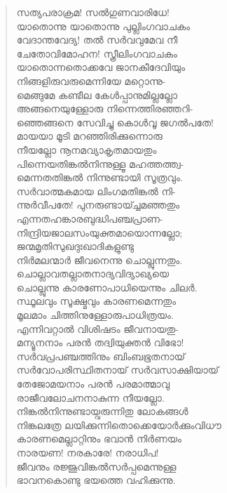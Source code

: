 \begin{verse}
സത്യപരാക്രമ! സല്‍ഗുണവാരിധേ!\\
യാതൊന്നു യാതൊന്നു പുല്ലിംഗവാചകം\\
വേദാന്തവേദ്യ! തല്‍ സര്‍വവുമേവ നീ\\
ചേതോവിമോഹന! സ്ത്രീലിംഗവാചകം\\
യാതൊന്നതൊക്കവേ ജാനകീദേവിയും\\
നിങ്ങളിരുവരുമെന്നിയേ മറ്റൊന്നു-\\
മെങ്ങുമേ കണ്ടീല കേള്‍പ്പാനുമില്ലല്ലോ\\
അങ്ങനെയുള്ളോരു നിന്നെത്തിരഞ്ഞറി-\\
ഞ്ഞെങ്ങനെ സേവിച്ചു കൊള്‍വൂ ജഗല്‍പതേ!\\
മായയാ മൂടി മറഞ്ഞിരിക്കുന്നൊരു\\
നീയല്ലോ നൂനമവ്യാകൃതമായതും\\
പിന്നെയതിങ്കല്‍നിന്നുള്ളൂ മഹത്തത്ത്വ-\\
മെന്നതതിങ്കല്‍ നിന്നുണ്ടായി സൂത്രവും.\\
സര്‍വാത്മകമായ ലിംഗമതിങ്കല്‍ നി-\\
ന്നുര്‍വീപതേ! പുനരുണ്ടായ്ച്ചമഞ്ഞതും\\
എന്നതഹങ്കാരബുദ്ധിപഞ്ചപ്രാണ-\\
നിന്ദ്രിയജാലസംയുക്തമായൊന്നല്ലോ;\\
ജന്മമൃതിസുഖദുഃഖാദികളുണ്ടു\\
നിര്‍മലന്മാര്‍ ജീവനെന്നു ചൊല്ലുന്നതും.\\
ചൊല്ലാവതല്ലാതനാദ്യവിദ്യാഖ്യയെ\\
ചൊല്ലുന്നു കാരണോപാധിയെന്നും ചില‍ര്‍.\\
സ്ഥൂലവും സൂക്ഷ്മവും കാരണമെന്നതും\\
മൂലമാം ചിത്തിനുള്ളോരുപാധിത്രയം.\\
എന്നിവറ്റാല്‍ വിശിഷടം ജീവനായതു-\\
മന്യൂനനാം പരന്‍ തദ്വിയുക്തന്‍ വിഭോ!\\
സര്‍വപ്രപഞ്ചത്തിനും ബിംബഭൂതനായ്\\
സര്‍വോപരിസ്ഥിതനായ് സര്‍വസാക്ഷിയായ്\\
തേജോമയനാം പരന്‍ പരമാത്മാവു\\
രാജീവലോചനനാകുന്ന നീയല്ലോ.\\
നിങ്കല്‍നിന്നുണ്ടായ്വരുന്നിതു ലോകങ്ങള്‍\\
നിങ്കലത്രേ ലയിക്കുന്നിതൊക്കെയോര്‍ക്കുംവിധൗ\\
കാരണമെല്ലാറ്റിനും ഭവാന്‍ നിര്‍ണയം\\
നാരയണ! നരകാരേ! നരാധിപ!\\
ജീവനും രജ്ജൂവിങ്കല്‍സര്‍പ്പമെന്നുള്ള\\
ഭാവനകൊണ്ടു ഭയത്തെ വഹിക്കുന്നു.\\

\end{verse}
